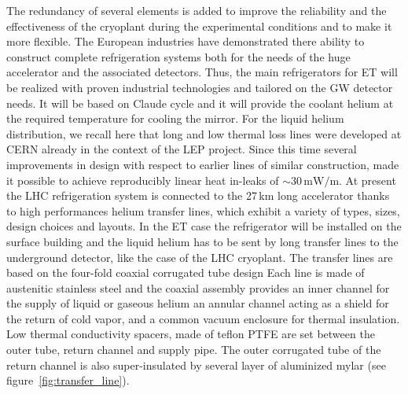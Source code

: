 The redundancy of several elements is added to improve the reliability and the effectiveness of the cryoplant during the experimental conditions and to make it more flexible. The European industries have demonstrated there ability to construct complete refrigeration systems both for the needs of the huge accelerator and the associated detectors. Thus, the main refrigerators for ET will be realized with proven industrial technologies and tailored on the GW detector needs. It will be based on Claude cycle and it will provide the coolant helium at the required temperature for cooling the mirror. For the liquid helium distribution, we recall here that long and low thermal loss lines were developed at CERN already in the context of the LEP project. Since this time several improvements in design with respect to earlier lines of similar construction, made it possible to achieve reproducibly linear heat in-leaks of $\sim 30\,\mathrm{mW/m}$. At present the LHC refrigeration system is connected to the 27\,km long accelerator thanks to high performances helium transfer lines, which exhibit a variety of types, sizes, design choices and layouts. In the ET case the refrigerator will be installed on the surface building and the liquid helium has to be sent by long transfer lines to the underground detector, like the case of the LHC cryoplant. The transfer lines are based on the four-fold coaxial corrugated tube design Each line is made of austenitic stainless steel and the coaxial assembly provides an inner channel for the supply of liquid or gaseous helium an annular channel acting as a shield for the return of cold vapor, and a common vacuum enclosure for thermal insulation. Low thermal conductivity spacers, made of teflon PTFE are set between the outer tube, return channel and supply pipe. The outer corrugated tube of the return channel is also super-insulated by several layer of aluminized mylar (see figure~\ref{fig:transfer_line}). 

